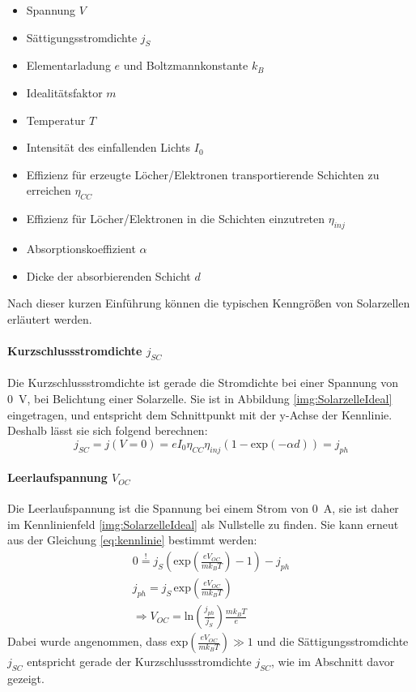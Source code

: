 \documentclass[12pt,a4paper,ngerman]{report}
\begin{document}
	\begin{itemize}
		\item Spannung $V$
		\item Sättigungsstromdichte $j_S$
		\item Elementarladung $e$ und Boltzmannkonstante $k_B$
		\item Idealitätsfaktor $m$
		\item Temperatur $T$
		\item Intensität des einfallenden Lichts $I_0$
		\item Effizienz für erzeugte Löcher/Elektronen transportierende Schichten zu erreichen $\eta_{CC}$
		\item Effizienz für Löcher/Elektronen in die Schichten einzutreten $\eta_{inj}$
		\item Absorptionskoeffizient $\alpha$
		\item Dicke der absorbierenden Schicht $d$
	\end{itemize}
	Nach dieser kurzen Einführung können die typischen Kenngrößen von Solarzellen erläutert werden.

	\paragraph{Kurzschlussstromdichte $j_{SC}$}
	Die Kurzschlussstromdichte ist gerade die Stromdichte bei einer Spannung von \SI{0}{\volt}, bei Belichtung einer Solarzelle. Sie ist in Abbildung \ref{img:SolarzelleIdeal} eingetragen, und entspricht dem Schnittpunkt mit der y-Achse der Kennlinie. Deshalb lässt sie sich folgend berechnen:
	\begin{equation}
		j_{SC} = j(V = 0) = e I_0 \eta_{CC} \eta_{inj} (1-\text{exp}(-\alpha d)) = j_{ph}
	\end{equation}
	\paragraph{Leerlaufspannung $V_{OC}$}
	Die Leerlaufspannung ist die Spannung bei einem Strom von \SI{0}{\ampere}, sie ist daher im Kennlinienfeld \ref{img:SolarzelleIdeal} als Nullstelle zu finden. Sie kann erneut aus der Gleichung \ref{eq:kennlinie} bestimmt werden:
	\begin{equation}
		\begin{split}
			 0 \overset{!}{=}  j_S \left(\text{exp}\left(\frac{e V_{OC}}{m k_B T}\right) - 1\right) - j_{ph}  \\
			 j_{ph} = j_S \, \text{exp}\left(\frac{e V_{OC}}{m k_B T}\right) \\
			 \Rightarrow V_{OC} = \text{ln} \left( \frac{j_{ph}}{j_S}\right) \frac{m k_B T}{e}
		\end{split}
	\end{equation} 
	Dabei wurde angenommen, dass $\text{exp}\left(\frac{e V_{OC}}{m k_B T}\right) \gg 1 $ und die Sättigungsstromdichte $j_{SC}$ entspricht gerade der Kurzschlussstromdichte $j_{SC}$, wie im Abschnitt davor gezeigt.
\end{document}
